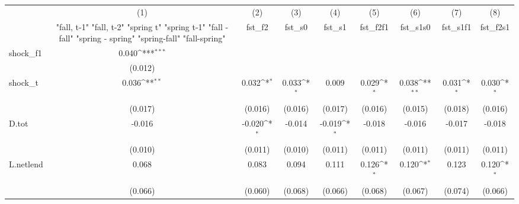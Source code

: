 {
\def\sym#1{\ifmmode^{#1}\else\(^{#1}\)\fi}
\begin{tabular}{l*{8}{c}}
\toprule
            &\multicolumn{1}{c}{(1)}&\multicolumn{1}{c}{(2)}&\multicolumn{1}{c}{(3)}&\multicolumn{1}{c}{(4)}&\multicolumn{1}{c}{(5)}&\multicolumn{1}{c}{(6)}&\multicolumn{1}{c}{(7)}&\multicolumn{1}{c}{(8)}\\
            &\multicolumn{1}{c}{  "fall, t-1" "fall, t-2" "spring t" "spring t-1"  "fall - fall" "spring - spring" "spring-fall" "fall-spring" }&\multicolumn{1}{c}{fst\_f2}&\multicolumn{1}{c}{fst\_s0}&\multicolumn{1}{c}{fst\_s1}&\multicolumn{1}{c}{fst\_f2f1}&\multicolumn{1}{c}{fst\_s1s0}&\multicolumn{1}{c}{fst\_s1f1}&\multicolumn{1}{c}{fst\_f2s1}\\
\midrule
shock\_f1    &       0.040\sym{***}&                     &                     &                     &                     &                     &                     &                     \\
            &     (0.012)         &                     &                     &                     &                     &                     &                     &                     \\
\addlinespace
shock\_t     &       0.036\sym{**} &       0.032\sym{*}  &       0.033\sym{*}  &       0.009         &       0.029\sym{*}  &       0.038\sym{**} &       0.031\sym{*}  &       0.030\sym{*}  \\
            &     (0.017)         &     (0.016)         &     (0.016)         &     (0.017)         &     (0.016)         &     (0.015)         &     (0.018)         &     (0.016)         \\
\addlinespace
D.tot       &      -0.016         &      -0.020\sym{*}  &      -0.014         &      -0.019\sym{*}  &      -0.018         &      -0.016         &      -0.017         &      -0.018         \\
            &     (0.010)         &     (0.011)         &     (0.010)         &     (0.011)         &     (0.011)         &     (0.011)         &     (0.011)         &     (0.011)         \\
\addlinespace
L.netlend   &       0.068         &       0.083         &       0.094         &       0.111         &       0.126\sym{*}  &       0.120\sym{*}  &       0.123         &       0.120\sym{*}  \\
            &     (0.066)         &     (0.060)         &     (0.068)         &     (0.066)         &     (0.068)         &     (0.067)         &     (0.074)         &     (0.066)         \\

\end{tabular}}
